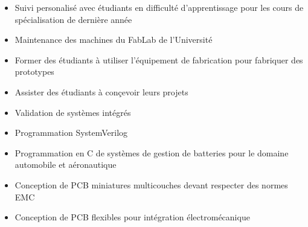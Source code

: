 \documentclass[10pt,a4paper,withhyper]{altacv}
\begin{document}
\begin{paracol}{2}



\begin{itemize}
\item Suivi personalisé avec étudiants en difficulté d'apprentissage pour les cours de spécialisation de dernière année
\end{itemize}

\divider
{}
\begin{itemize}
\item Maintenance des machines du FabLab de l'Université
\item Former des étudiants à utiliser l'équipement de fabrication pour fabriquer des prototypes
\item Assister des étudiants à conçevoir leurs projets
\end{itemize}

\divider
{}
\begin{itemize}
\item Validation de systèmes intégrés
\item Programmation SystemVerilog
\end{itemize}

\divider
{}
\begin{itemize}
\item Programmation en C de systèmes de gestion de batteries pour le domaine automobile et aéronautique
\end{itemize}

\divider
{}
\begin{itemize}
\item Conception de PCB miniatures multicouches devant respecter des normes EMC
\item Conception de PCB flexibles pour intégration électromécanique
\end{itemize}


\end{paracol}
\end{document}
